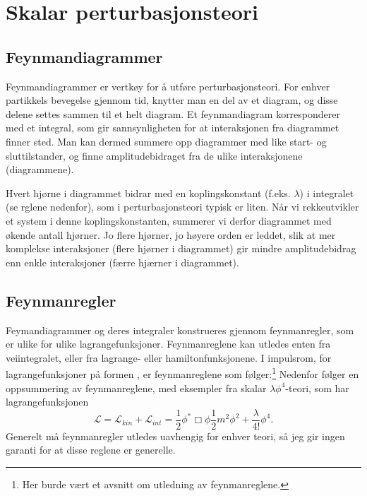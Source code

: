 \documentclass{article}
\renewcommand{\L}{\mathcal{L}}
\begin{document}
\section{Skalar perturbasjonsteori}

\subsection{Feynmandiagrammer}
\label{feynmandiagrammer}
Feynmandiagrammer er vertkøy for å utføre perturbasjonsteori.
For enhver partikkels bevegelse gjennom tid, knytter man en del av et diagram, og disse delene settes sammen til et helt diagram.
Et feynmandiagram korresponderer med et integral, som gir sannsynligheten for at interaksjonen fra diagrammet finner sted.
Man kan dermed summere opp diagrammer med like start- og sluttilstander, og finne amplitudebidraget fra de ulike interaksjonene (diagrammene).

Hvert hjørne i diagrammet bidrar med en koplingskonstant (f.eks. $\lambda$) i integralet (se rglene nedenfor), som i perturbasjonsteori typisk er liten.
Når vi rekkeutvikler et system i denne koplingskonstanten, summerer vi derfor diagrammet med økende antall hjørner. 
Jo flere hjørner, jo høyere orden er leddet, slik at mer komplekse interaksjoner (flere hjørner i diagrammet) gir mindre amplitudebidrag enn enkle interaksjoner (færre hjærner i diagrammet).

\subsection{Feynmanregler}
Feymandiagrammer og deres integraler konstrueres gjennom feynmanregler, som er ulike for ulike lagrangefunksjoner.
Feynmanreglene kan utledes enten fra veiintegralet, eller fra lagrange- eller hamiltonfunksjonene.
I impulsrom, for lagrangefunksjoner på formen , er feynmanreglene som følger:\footnote{
    Her burde vært et avsnitt om utledning av feynmanreglene.
    }
Nedenfor følger en oppsummering av feynmanreglene, med eksempler fra skalar $\lambda \phi^4$-teori, som har lagrangefunksjonen
\begin{equation}
    \label{skalar_phi4}
    \L = \L_{kin} + \L_{int} 
        = \frac{1}{2} \phi^* \Box \phi \frac{1}{2} m^2 \phi^2
        + \frac{\lambda}{4!} \phi^4.
\end{equation}
Generelt må feynmanregler utledes uavhengig for enhver teori, så jeg gir ingen garanti for at disse reglene er generelle.
\end{document}
